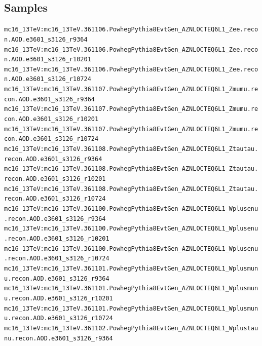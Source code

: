 \subsection{Samples}\label{SampleFiles}
\fontsize{0.3cm}{0.3cm}\texttt{mc16\_13TeV:mc16\_13TeV.361106.PowhegPythia8EvtGen\_AZNLOCTEQ6L1\_Zee.recon.AOD.e3601\_s3126\_r9364\newline   
 mc16\_13TeV:mc16\_13TeV.361106.PowhegPythia8EvtGen\_AZNLOCTEQ6L1\_Zee.recon.AOD.e3601\_s3126\_r10201\newline   
 mc16\_13TeV:mc16\_13TeV.361106.PowhegPythia8EvtGen\_AZNLOCTEQ6L1\_Zee.recon.AOD.e3601\_s3126\_r10724\newline   
 mc16\_13TeV:mc16\_13TeV.361107.PowhegPythia8EvtGen\_AZNLOCTEQ6L1\_Zmumu.recon.AOD.e3601\_s3126\_r9364\newline   
 mc16\_13TeV:mc16\_13TeV.361107.PowhegPythia8EvtGen\_AZNLOCTEQ6L1\_Zmumu.recon.AOD.e3601\_s3126\_r10201\newline    
 mc16\_13TeV:mc16\_13TeV.361107.PowhegPythia8EvtGen\_AZNLOCTEQ6L1\_Zmumu.recon.AOD.e3601\_s3126\_r10724\newline    
 mc16\_13TeV:mc16\_13TeV.361108.PowhegPythia8EvtGen\_AZNLOCTEQ6L1\_Ztautau.recon.AOD.e3601\_s3126\_r9364\newline    
 mc16\_13TeV:mc16\_13TeV.361108.PowhegPythia8EvtGen\_AZNLOCTEQ6L1\_Ztautau.recon.AOD.e3601\_s3126\_r10201\newline    
 mc16\_13TeV:mc16\_13TeV.361108.PowhegPythia8EvtGen\_AZNLOCTEQ6L1\_Ztautau.recon.AOD.e3601\_s3126\_r10724\newline    
 mc16\_13TeV:mc16\_13TeV.361100.PowhegPythia8EvtGen\_AZNLOCTEQ6L1\_Wplusenu.recon.AOD.e3601\_s3126\_r9364\newline    
 mc16\_13TeV:mc16\_13TeV.361100.PowhegPythia8EvtGen\_AZNLOCTEQ6L1\_Wplusenu.recon.AOD.e3601\_s3126\_r10201\newline    
 mc16\_13TeV:mc16\_13TeV.361100.PowhegPythia8EvtGen\_AZNLOCTEQ6L1\_Wplusenu.recon.AOD.e3601\_s3126\_r10724\newline    
 mc16\_13TeV:mc16\_13TeV.361101.PowhegPythia8EvtGen\_AZNLOCTEQ6L1\_Wplusmunu.recon.AOD.e3601\_s3126\_r9364\newline    
 mc16\_13TeV:mc16\_13TeV.361101.PowhegPythia8EvtGen\_AZNLOCTEQ6L1\_Wplusmunu.recon.AOD.e3601\_s3126\_r10201\newline    
 mc16\_13TeV:mc16\_13TeV.361101.PowhegPythia8EvtGen\_AZNLOCTEQ6L1\_Wplusmunu.recon.AOD.e3601\_s3126\_r10724\newline    
 mc16\_13TeV:mc16\_13TeV.361102.PowhegPythia8EvtGen\_AZNLOCTEQ6L1\_Wplustaunu.recon.AOD.e3601\_s3126\_r9364\newline    
}
